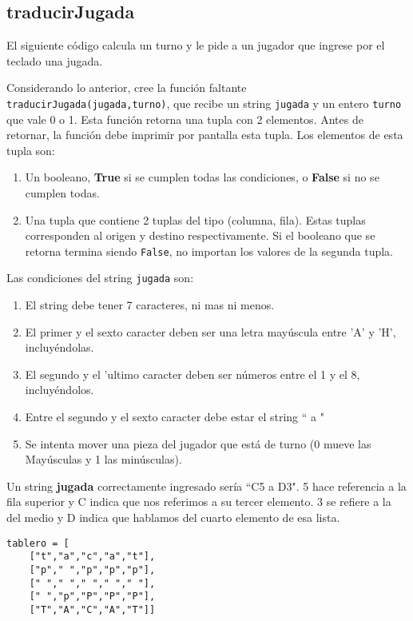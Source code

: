 \subsection*{traducirJugada}

El siguiente código calcula un turno y le pide a un jugador que ingrese por el teclado una jugada.



Considerando lo anterior, cree la función faltante \texttt{traducirJugada(jugada,turno)}, que recibe un string \texttt{jugada} y un entero \texttt{turno} que vale 0 o 1. Esta función retorna una tupla con 2 elementos. Antes de retornar, la función debe imprimir por pantalla esta tupla. Los elementos de esta tupla son:
\begin{enumerate}
    \item Un booleano, \textbf{True} si se cumplen todas las condiciones, o \textbf{False} si no se cumplen todas.
    \item Una tupla que contiene 2 tuplas del tipo (columna, fila). Estas tuplas corresponden al origen y destino respectivamente. Si el booleano que se retorna termina siendo \texttt{False}, no importan los valores de la segunda tupla.
\end{enumerate}

Las condiciones del string \texttt{jugada} son:
\begin{enumerate}
    \item El string debe tener 7 caracteres, ni mas ni menos.
    \item El primer y el sexto caracter deben ser una letra mayúscula entre 'A' y 'H', incluyéndolas.
    \item El segundo y el 'ultimo caracter deben ser números entre el 1 y el 8, incluyéndolos.
    \item Entre el segundo y el sexto caracter debe estar el string `` a "
    \item Se intenta mover una pieza del jugador que está de turno (0 mueve las Mayúsculas y 1 las minúsculas).
\end{enumerate}

Un string \textbf{jugada} correctamente ingresado sería ``C5 a D3". 5 hace referencia a la fila superior y C indica que nos referimos a su tercer elemento. 3 se refiere a la del medio y D indica que hablamos del cuarto elemento de esa lista. 

\begin{lstlisting}[style=consola]
tablero = [
    ["t","a","c","a","t"],
    ["p"," ","p","p","p"],
    [" "," "," "," "," "],
    [" ","p","P","P","P"],
    ["T","A","C","A","T"]]
\end{lstlisting}

